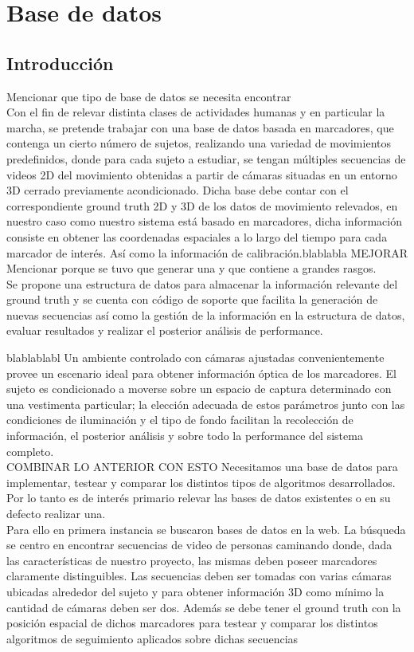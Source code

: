 \section{Base de datos}


\subsection{Introducción}
\label{}
Mencionar que tipo de base de datos se necesita encontrar\\
Con el fin de relevar distinta clases de actividades humanas y en particular la marcha, se pretende trabajar con una base de datos basada en marcadores, que contenga un cierto número de sujetos, realizando una variedad de movimientos predefinidos, donde para cada sujeto a estudiar, se tengan múltiples secuencias de videos 2D del movimiento obtenidas a partir de cámaras situadas en un entorno 3D cerrado previamente acondicionado. Dicha base debe contar con el correspondiente ground truth 2D y 3D de los datos de movimiento relevados, en nuestro caso como nuestro sistema está basado en marcadores, dicha información consiste en obtener las coordenadas espaciales a lo largo del tiempo para cada marcador de interés. Así como la información de calibración.blablabla MEJORAR \\

Mencionar porque se tuvo que generar una y que contiene a grandes rasgos.\\
Se propone una estructura de datos para almacenar la información relevante del ground truth y  se cuenta con código de soporte que facilita la generación de nuevas secuencias así como la gestión de la información en la estructura de datos, evaluar resultados y realizar el  posterior análisis de performance.


blablablabl
Un ambiente controlado con cámaras ajustadas convenientemente provee un escenario ideal para obtener información óptica de los marcadores. El sujeto es condicionado a moverse sobre un espacio de captura determinado con una vestimenta particular; la elección adecuada de estos parámetros junto con las condiciones de iluminación y el tipo de fondo facilitan la recolección de información, el posterior análisis y sobre todo la performance del sistema completo.
\\COMBINAR LO ANTERIOR CON ESTO
Necesitamos una base de datos para implementar, testear y comparar los distintos tipos de algoritmos desarrollados. Por lo tanto es de interés primario relevar las bases de datos existentes o en su defecto realizar una.\\
Para ello en primera instancia se buscaron bases de datos en la web. La búsqueda se centro en encontrar secuencias de video de personas caminando donde, dada las características de nuestro proyecto, las mismas deben poseer marcadores claramente distinguibles. Las secuencias deben ser tomadas con varias cámaras ubicadas alrededor del sujeto y para obtener información 3D como mínimo la cantidad de cámaras deben ser dos. Además se debe tener el ground truth con la posición espacial de dichos marcadores para testear y comparar los distintos algoritmos de seguimiento aplicados sobre dichas secuencias


